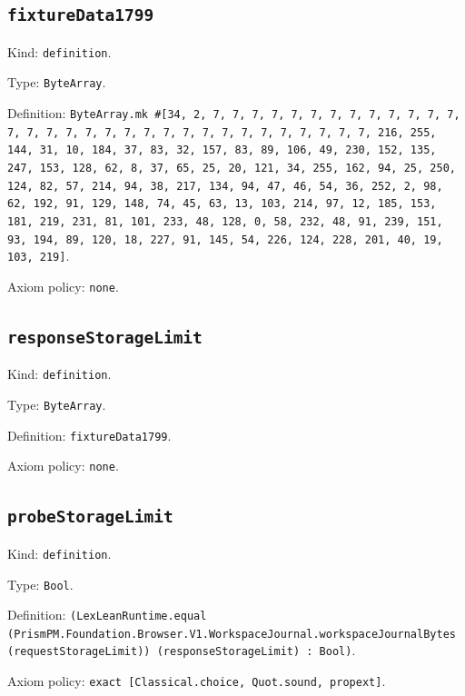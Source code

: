\documentclass[11pt]{article}
\begin{document}
\subsection*{\texttt{fixtureData1799}}
\noindent Kind: \texttt{definition}.\par
\noindent Type: \texttt{ByteArray}.\par
\noindent Definition: \texttt{ByteArray.mk \#[34, 2, 7, 7, 7, 7, 7, 7, 7, 7, 7, 7, 7, 7, 7, 7, 7, 7, 7, 7, 7, 7, 7, 7, 7, 7, 7, 7, 7, 7, 7, 7, 7, 7, 216, 255, 144, 31, 10, 184, 37, 83, 32, 157, 83, 89, 106, 49, 230, 152, 135, 247, 153, 128, 62, 8, 37, 65, 25, 20, 121, 34, 255, 162, 94, 25, 250, 124, 82, 57, 214, 94, 38, 217, 134, 94, 47, 46, 54, 36, 252, 2, 98, 62, 192, 91, 129, 148, 74, 45, 63, 13, 103, 214, 97, 12, 185, 153, 181, 219, 231, 81, 101, 233, 48, 128, 0, 58, 232, 48, 91, 239, 151, 93, 194, 89, 120, 18, 227, 91, 145, 54, 226, 124, 228, 201, 40, 19, 103, 219]}.\par
\noindent Axiom policy: \texttt{none}.\par
\subsection*{\texttt{responseStorageLimit}}
\noindent Kind: \texttt{definition}.\par
\noindent Type: \texttt{ByteArray}.\par
\noindent Definition: \texttt{fixtureData1799}.\par
\noindent Axiom policy: \texttt{none}.\par
\subsection*{\texttt{probeStorageLimit}}
\noindent Kind: \texttt{definition}.\par
\noindent Type: \texttt{Bool}.\par
\noindent Definition: \texttt{(LexLeanRuntime.equal (PrismPM.Foundation.Browser.V1.WorkspaceJournal.workspaceJournalBytes (requestStorageLimit)) (responseStorageLimit) : Bool)}.\par
\noindent Axiom policy: \texttt{exact [Classical.choice, Quot.sound, propext]}.\par
\end{document}
